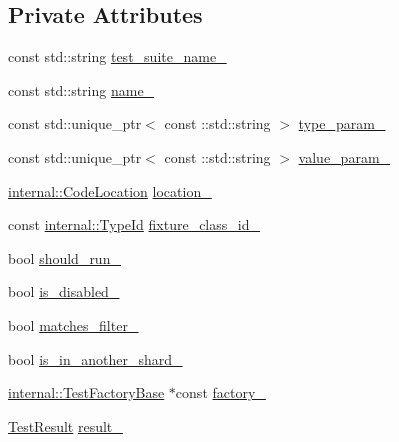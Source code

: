 \subsection*{Private Attributes}
\begin{DoxyCompactItemize}
\item 
const std\+::string \hyperlink{classtesting_1_1TestInfo_ac5beda04eb320588955c8954dc6c2eb0}{test\+\_\+suite\+\_\+name\+\_\+}
\item 
const std\+::string \hyperlink{classtesting_1_1TestInfo_a6bed52b7c3d66c8c5eac5fa2aaadba55}{name\+\_\+}
\item 
const std\+::unique\+\_\+ptr$<$ const \+::std\+::string $>$ \hyperlink{classtesting_1_1TestInfo_a6c6d79e6238f2af5093e2c419480b433}{type\+\_\+param\+\_\+}
\item 
const std\+::unique\+\_\+ptr$<$ const \+::std\+::string $>$ \hyperlink{classtesting_1_1TestInfo_adf2e7579cf713f7b2df1d542ca2ab9ff}{value\+\_\+param\+\_\+}
\item 
\hyperlink{structtesting_1_1internal_1_1CodeLocation}{internal\+::\+Code\+Location} \hyperlink{classtesting_1_1TestInfo_a749494420174e6cf1949c7b411e8df6f}{location\+\_\+}
\item 
const \hyperlink{namespacetesting_1_1internal_ab1114197d3c657d8b7f8e0c5caa12d00}{internal\+::\+Type\+Id} \hyperlink{classtesting_1_1TestInfo_ad3284b7b9ebe61cc31440694091450ae}{fixture\+\_\+class\+\_\+id\+\_\+}
\item 
bool \hyperlink{classtesting_1_1TestInfo_a89c3d8fb8b565532c34d3123240fd5cf}{should\+\_\+run\+\_\+}
\item 
bool \hyperlink{classtesting_1_1TestInfo_af3765fc4f811296e0699b0a26430a7c7}{is\+\_\+disabled\+\_\+}
\item 
bool \hyperlink{classtesting_1_1TestInfo_a397686f82b6dd68a209ab7b50eeb4932}{matches\+\_\+filter\+\_\+}
\item 
bool \hyperlink{classtesting_1_1TestInfo_a7db5fe84e625c2d5b60544e15fbb75a3}{is\+\_\+in\+\_\+another\+\_\+shard\+\_\+}
\item 
\hyperlink{classtesting_1_1internal_1_1TestFactoryBase}{internal\+::\+Test\+Factory\+Base} $\ast$const \hyperlink{classtesting_1_1TestInfo_a6bf2422602b877c73f6eb169a63cfea8}{factory\+\_\+}
\item 
\hyperlink{classtesting_1_1TestResult}{Test\+Result} \hyperlink{classtesting_1_1TestInfo_a108fd469897a8d4e5c4361947a5ed785}{result\+\_\+}
\end{DoxyCompactItemize}
